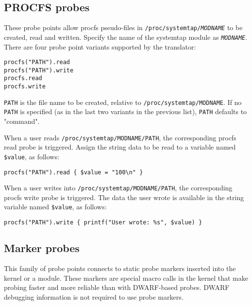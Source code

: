 \documentclass[twoside,english]{article}
\newenvironment{vindent}
{\begin{list}{}{\setlength{\listparindent}{6pt}}
\item[]}
{\end{list}}
\begin{document}
\subsection{PROCFS probes}
These probe points allow procfs pseudo-files in
\texttt{/proc/systemtap/\textit{MODNAME}} to be created, read and
written.  Specify the name of the systemtap module as
\texttt{\textit{MODNAME}}.  There are four probe point variants
supported by the translator:
\begin{vindent}
\begin{verbatim}
procfs("PATH").read
procfs("PATH").write
procfs.read
procfs.write
\end{verbatim}
\end{vindent}

\texttt{PATH} is the file name to be created, relative to
\texttt{/proc/systemtap/MODNAME}.  If no \texttt{PATH} is specified
(as in the last two variants in the previous list), \texttt{PATH}
defaults to "command".

When a user reads \texttt{/proc/systemtap/MODNAME/PATH}, the
corresponding procfs read probe is triggered.  Assign the string data
to be read to a variable named \texttt{\$value}, as follows:
\begin{vindent}
\begin{verbatim}
procfs("PATH").read { $value = "100\n" }
\end{verbatim}
\end{vindent}

When a user writes into \texttt{/proc/systemtap/MODNAME/PATH}, the
corresponding procfs write probe is triggered.  The data the user
wrote is available in the string variable named \texttt{\$value}, as
follows:
\begin{vindent}
\begin{verbatim}
procfs("PATH").write { printf("User wrote: %s", $value) }
\end{verbatim}
\end{vindent}


\subsection{Marker probes}
This family of probe points connects to static probe markers inserted
into the kernel or a module. These markers are special macro calls in
the kernel that make probing faster and more reliable than with
DWARF-based probes.  DWARF debugging information is not required to
use probe markers.
\end{document}
